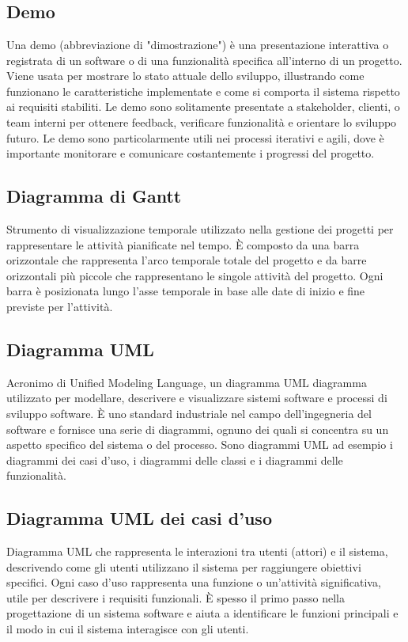 
\section{}

\hypertarget{sec:demo}{}
\subsection*{Demo}
Una demo (abbreviazione di "dimostrazione") è una presentazione interattiva o registrata di un software o di una funzionalità specifica all'interno di un 
progetto. Viene usata per mostrare lo stato attuale dello sviluppo, illustrando come funzionano le caratteristiche implementate e come si comporta il 
sistema rispetto ai requisiti stabiliti. Le demo sono solitamente presentate a stakeholder, clienti, o team interni per ottenere feedback, verificare 
funzionalità e orientare lo sviluppo futuro. Le demo sono particolarmente utili nei processi iterativi e agili, dove è importante monitorare e comunicare 
costantemente i progressi del progetto.

\subsection*{Diagramma di Gantt}
Strumento di visualizzazione temporale utilizzato nella gestione dei progetti per rappresentare le attività pianificate nel tempo. È composto da una barra 
orizzontale che rappresenta l’arco temporale totale del progetto e da barre orizzontali più piccole che rappresentano le singole attività del progetto. 
Ogni barra è posizionata lungo l’asse temporale in base alle date di inizio e fine previste per l’attività.

\subsection*{Diagramma UML}
Acronimo di Unified Modeling Language, un diagramma UML diagramma utilizzato per modellare, descrivere e visualizzare sistemi software e processi di sviluppo 
software. È uno standard industriale nel campo dell’ingegneria del software e fornisce una serie di diagrammi, ognuno dei quali si concentra su un aspetto 
specifico del sistema o del processo. Sono diagrammi UML ad esempio i diagrammi dei casi d’uso, i diagrammi delle classi e i diagrammi delle funzionalità.

\subsection*{Diagramma UML dei casi d'uso}
Diagramma UML che rappresenta le interazioni tra utenti (attori) e il sistema, descrivendo come gli utenti utilizzano il sistema per raggiungere obiettivi 
specifici. Ogni caso d'uso rappresenta una funzione o un'attività significativa, utile per descrivere i requisiti funzionali. È spesso il primo passo nella 
progettazione di un sistema software e aiuta a identificare le funzioni principali e il modo in cui il sistema interagisce con gli utenti.

